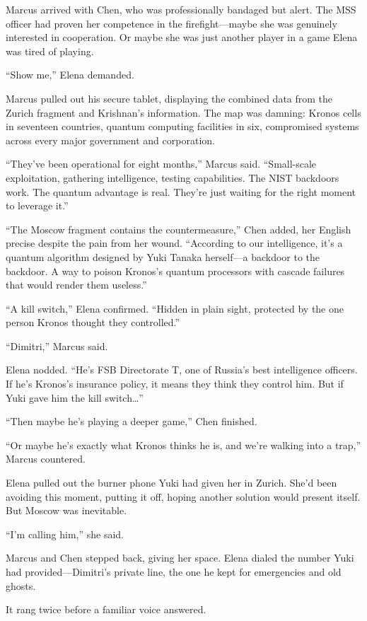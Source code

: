 Marcus arrived with Chen, who was professionally bandaged but alert. The MSS officer had proven her competence in the firefight---maybe she was genuinely interested in cooperation. Or maybe she was just another player in a game Elena was tired of playing.

``Show me,'' Elena demanded.

Marcus pulled out his secure tablet, displaying the combined data from the Zurich fragment and Krishnan's information. The map was damning: Kronos cells in seventeen countries, quantum computing facilities in six, compromised systems across every major government and corporation.

``They've been operational for eight months,'' Marcus said. ``Small-scale exploitation, gathering intelligence, testing capabilities. The NIST backdoors work. The quantum advantage is real. They're just waiting for the right moment to leverage it.''

``The Moscow fragment contains the countermeasure,'' Chen added, her English precise despite the pain from her wound. ``According to our intelligence, it's a quantum algorithm designed by Yuki Tanaka herself---a backdoor to the backdoor. A way to poison Kronos's quantum processors with cascade failures that would render them useless.''

``A kill switch,'' Elena confirmed. ``Hidden in plain sight, protected by the one person Kronos thought they controlled.''

``Dimitri,'' Marcus said.

Elena nodded. ``He's FSB Directorate T, one of Russia's best intelligence officers. If he's Kronos's insurance policy, it means they think they control him. But if Yuki gave him the kill switch\ldots{}''

``Then maybe he's playing a deeper game,'' Chen finished.

``Or maybe he's exactly what Kronos thinks he is, and we're walking into a trap,'' Marcus countered.

Elena pulled out the burner phone Yuki had given her in Zurich. She'd been avoiding this moment, putting it off, hoping another solution would present itself. But Moscow was inevitable.

``I'm calling him,'' she said.

Marcus and Chen stepped back, giving her space. Elena dialed the number Yuki had provided---Dimitri's private line, the one he kept for emergencies and old ghosts.

It rang twice before a familiar voice answered.

